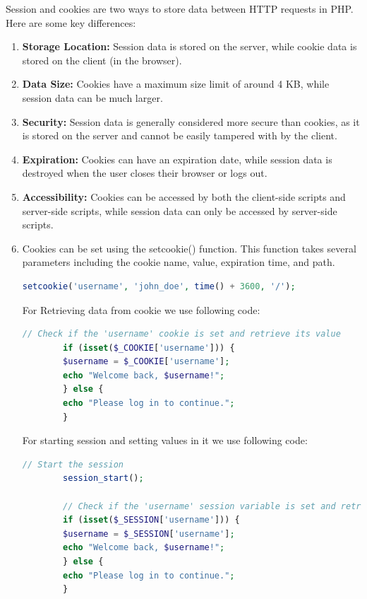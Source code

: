 \documentclass[11pt]{article}
\begin{document}
Session and cookies are two ways to store data between HTTP requests in PHP. Here are some key differences:

\begin{enumerate}
    \item \textbf{Storage Location:} Session data is stored on the server, while cookie data is stored on the client (in the browser).

    \item \textbf{Data Size:} Cookies have a maximum size limit of around 4 KB, while session data can be much larger.
    
    \item \textbf{Security:} Session data is generally considered more secure than cookies, as it is stored on the server and cannot be easily tampered with by the client.
    
    \item \textbf{Expiration:} Cookies can have an expiration date, while session data is destroyed when the user closes their browser or logs out.
    
    \item \textbf{Accessibility:} Cookies can be accessed by both the client-side scripts and server-side scripts, while session data can only be accessed by server-side scripts.
    \item Cookies can be set using the setcookie() function. This function takes several parameters including the cookie name, value, expiration time, and path.
    \begin{lstlisting}[language=php]
        setcookie('username', 'john_doe', time() + 3600, '/');
    \end{lstlisting}
    For Retrieving data from cookie we use following code:
    \begin{lstlisting}[language=php]
        // Check if the 'username' cookie is set and retrieve its value
        if (isset($_COOKIE['username'])) {
        $username = $_COOKIE['username'];
        echo "Welcome back, $username!";
        } else {
        echo "Please log in to continue.";
        }
    \end{lstlisting}
    For starting session and setting values in it we use following code:
    \begin{lstlisting}[language=php]
        // Start the session
        session_start();

        // Check if the 'username' session variable is set and retrieve its value
        if (isset($_SESSION['username'])) {
        $username = $_SESSION['username'];
        echo "Welcome back, $username!";
        } else {
        echo "Please log in to continue.";
        }


\end{lstlisting}
\end{enumerate}
\end{document}
